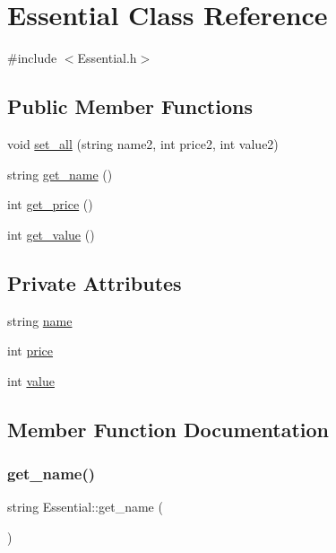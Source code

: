\hypertarget{classEssential}{}\section{Essential Class Reference}
\label{classEssential}


{\ttfamily \#include $<$Essential.\+h$>$}

\subsection*{Public Member Functions}
\begin{DoxyCompactItemize}
\item 
void \hyperlink{classEssential_ad8fbff7d58e0de81f1fb149b8bc2046b}{set\+\_\+all} (string name2, int price2, int value2)
\item 
string \hyperlink{classEssential_aba8ce6fdf53a6774307c476b84372aa3}{get\+\_\+name} ()
\item 
int \hyperlink{classEssential_a94f56c25d035a8644b3ef588faab1b8e}{get\+\_\+price} ()
\item 
int \hyperlink{classEssential_acb67326e6ff89e63176a51a22cad4aaa}{get\+\_\+value} ()
\end{DoxyCompactItemize}
\subsection*{Private Attributes}
\begin{DoxyCompactItemize}
\item 
string \hyperlink{classEssential_a9dda661085733a2fc48f5b6a52645cf1}{name}
\item 
int \hyperlink{classEssential_aea9b892763058d183a3a6fdc74501e09}{price}
\item 
int \hyperlink{classEssential_a65c36b046d68a89c494e87859f49afc7}{value}
\end{DoxyCompactItemize}


\subsection{Member Function Documentation}
\mbox{\label{classEssential_aba8ce6fdf53a6774307c476b84372aa3}} 
\subsubsection{\texorpdfstring{get\+\_\+name()}{get\_name()}}
{\footnotesize\ttfamily string Essential\+::get\+\_\+name (\begin{DoxyParamCaption}{ }\end{DoxyParamCaption})}

